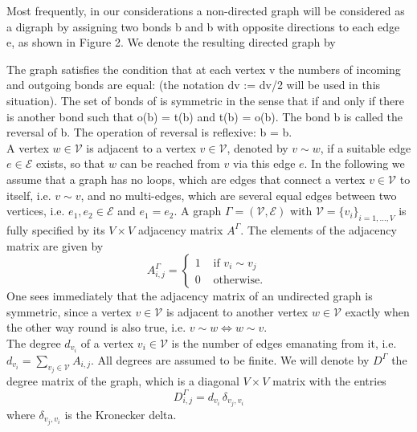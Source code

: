 Most frequently, in our considerations a non-directed graph will be considered as a digraph by assigning two bonds b and b with opposite directions to each edge e, as shown in Figure 2. We denote the resulting directed graph by 


The graph  satisfies the condition that at each vertex  v the numbers of incoming and outgoing bonds are equal: (the notation dv := dv/2 will be used in this situation). The set of bonds of  is symmetric in the sense that  if and only if there is another bond such that o(b) = t(b) and t(b) = o(b). The bond b is called the reversal of b. The operation of reversal is reflexive: b = b.
\\
A vertex $w \in \mathcal{V}$ is adjacent to a vertex $v \in \mathcal{V}$, denoted by $v \sim w$, if a suitable edge $e \in \mathcal{E}$ exists, so that $w$ can be reached from $v$ via this edge $e$. In the following we assume that a graph has no loops, which are edges that connect a vertex $v \in \mathcal{V}$ to itself, i.e. $v \sim v$, and no multi-edges, which are several equal edges between two vertices, i.e. $e_1, e_2 \in \mathcal{E}$ and $e_1 = e_2$. A graph $\Gamma = (\mathcal{V}, \mathcal{E})$ with $\mathcal{V} = \{v_i\}_{i = 1, \ldots, V}$ is fully specified by its $V \times V$ adjacency matrix $A^{\Gamma}$. The elements of the adjacency matrix are given by
\begin{equation}
    \label{adjacency matrix}
    A^{\Gamma}_{i, j}= \begin{cases} 1 & \text { if } v_i \sim v_j \\ 0 & \text { otherwise. } \end{cases}
\end{equation}
One sees immediately that the adjacency matrix of an undirected graph is symmetric, since a vertex $v \in \mathcal{V}$ is adjacent to another vertex $w \in \mathcal{V}$ exactly when the other way round is also true, i.e. $v \sim w \Leftrightarrow w \sim v$. \\
The degree $d_{v_i}$ of a vertex $v_i \in \mathcal{V}$ is the number of edges emanating from it, i.e. $d_{v_i} = \sum_{v_j \in \mathcal{V}} A_{i, j}$. All degrees are assumed to be finite. We will denote by $D^{\Gamma}$ the degree matrix of the graph, which is a diagonal $V \times V$ matrix with the entries
\begin{equation}
    \label{degree matrix}
    D^{\Gamma}_{i, j} = d_{v_i} \, \delta_{v_j, v_i}
\end{equation}
where $\delta_{v_j, v_i}$ is the Kronecker delta. \\

